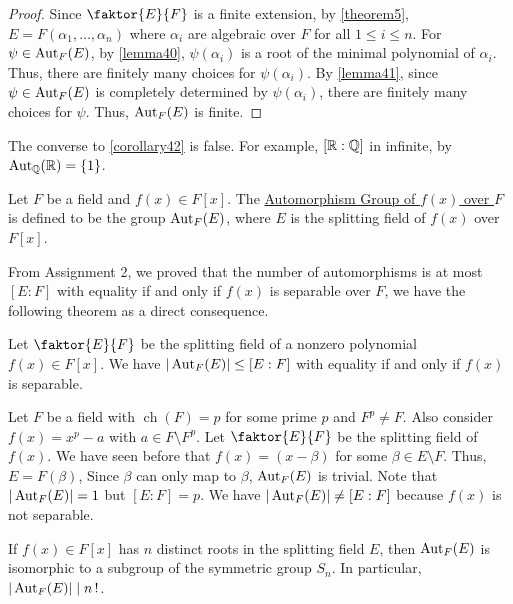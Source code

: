 \documentclass[11pt]{article}
\newcommand{\quotient}[2]{\faktor{#1}{#2}}
\DeclareMathOperator{\ch}{ch}
\begin{document}
\begin{proof}
Since $\quotient{E}{F}$ is a finite extension, by \cref{theorem5}, $E =
F(\alpha_1, \dots, \alpha_n)$ where $\alpha_i$ are algebraic over $F$ for all
$1 \leq i \leq n$. For $\psi \in \operatorname{Aut}_F(E)$, by \cref{lemma40}, $\psi(\alpha_i)$
is a root of the minimal polynomial of $\alpha_i$. Thus, there are finitely many
choices for $\psi(\alpha_i)$. By \cref{lemma41}, since $\psi \in \operatorname{Aut}_F(E)$ is
completely determined by $\psi(\alpha_i)$, there are finitely many choices for
$\psi$. Thus, $\operatorname{Aut}_F(E)$ is finite.
\end{proof}
\begin{remark}
The converse to \cref{corollary42} is false. For example, $[\mathbb{R}:\mathbb{Q}]$ in infinite,
by $\operatorname{Aut}_{\mathbb{Q}}(\mathbb{R}) = \{1\}$.
\end{remark}
\begin{definition}
Let $F$ be a field and $f(x) \in F[x]$. The \underline{Automorphism Group of
$f(x)$ over $F$} is defined to be the group $\operatorname{Aut}_F(E)$, where $E$ is the
splitting field of $f(x)$ over $F[x]$.
\end{definition}
From Assignment 2, we proved that the number of automorphisms is at most $[E:F]$
with equality if and only if $f(x)$ is separable over $F$, we have the following
theorem as a direct consequence.
\begin{theorem}
Let $\quotient{E}{F}$ be the splitting field of a nonzero polynomial $f(x) \in
F[x]$. We have $|\operatorname{Aut}_F(E)| \leq [E:F]$ with equality if and only if $f(x)$ is
separable.
\label{theorem43}
\end{theorem}
\begin{example}
Let $F$ be a field with $\ch(F) = p$ for some prime $p$ and $F^p \neq F$. Also
consider $f(x) = x^p-a$ with $a \in F \setminus F^p$. Let $\quotient{E}{F}$ be
the splitting field of $f(x)$. We have seen before that $f(x) = (x - \beta)$ for
some $\beta \in E \setminus F$. Thus, $E = F(\beta)$, Since $\beta$ can only map
to $\beta$, $\operatorname{Aut}_F(E)$ is trivial. Note that $|\operatorname{Aut}_F(E)| =1$ but $[E:F] = p$.
We have $|\operatorname{Aut}_F(E)| \neq [E:F]$ because $f(x)$ is not separable.
\end{example}
\begin{theorem}
If $f(x) \in F[x]$ has $n$ distinct roots in the splitting field $E$, then
$\operatorname{Aut}_F(E)$ is isomorphic to a subgroup of the symmetric group $S_n$. In
particular, $|\operatorname{Aut}_F(E)| \mid n\operatorname{!}$.
\label{theorem44}
\end{theorem}
\end{document}
